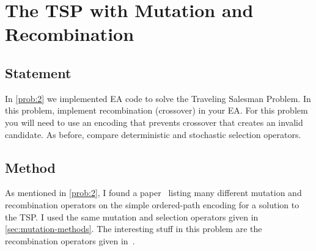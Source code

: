 \documentclass{article}
\begin{document}
\section{The TSP with Mutation and Recombination}\label{prob:3}

\subsection{Statement}
In \autoref{prob:2} we implemented EA code to solve the Traveling Salesman Problem. In this
problem, implement recombination (crossover) in your EA. For this problem you will need to use an
encoding that prevents crossover that creates an invalid candidate. As before, compare
deterministic and stochastic selection operators.

\subsection{Method}
As mentioned in \autoref{prob:2}, I found a paper~\cite{tsp_ea} listing many different mutation and
recombination operators on the simple ordered-path encoding for a solution to the TSP. I used the
same mutation and selection operators given in \autoref{sec:mutation-methods}. The interesting
stuff in this problem are the recombination operators given in~\cite{tsp_ea}.
\end{document}
